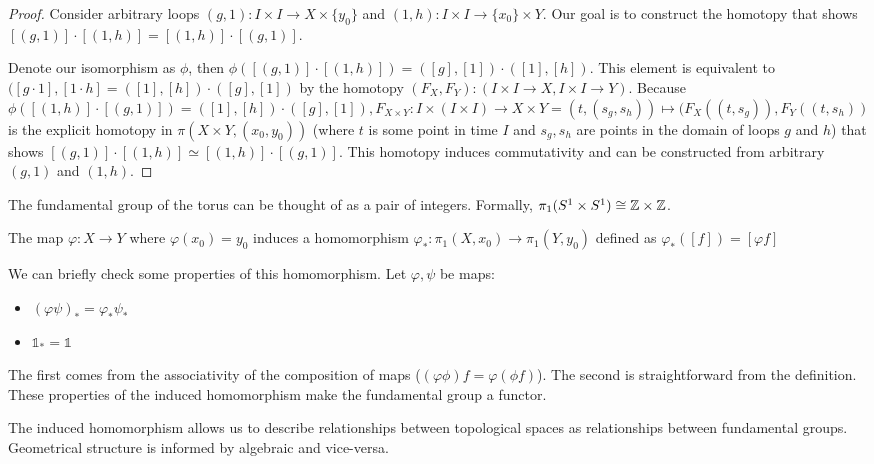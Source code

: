 \documentclass[10pt]{article}
\begin{document}
\begin{proof}
	Consider arbitrary loops $(g, 1): I \times I \to X \times \{y_0\}$ and $(1, h): I
	\times I \to \{ x_0 \} \times Y$. Our goal is to construct the homotopy that
	shows $[(g, 1)] \cdot [(1, h)] = [(1, h)] \cdot [(g, 1)]$.

	Denote our isomorphism as $\phi$, then $\phi([(g, 1)] \cdot [(1, h)]) =
	([g], [1]) \cdot ([1], [h])$. This element is equivalent to $([g \cdot 1], [1
	\cdot h] = ([1], [h]) \cdot ([g], [1])$ by the homotopy $(F_X, F_Y): (I
	\times I \to X, I \times I \to Y)$. Because $\phi([(1, h)]\cdot[(g, 1)]) =
	([1], [h]) \cdot ([g], [1]), F_{X\times Y}: I \times (I \times I) \to X \times
	Y = (t, (s_g, s_h)) \mapsto (F_X((t, s_g)), F_Y((t, s_h))$ is the explicit
	homotopy in $\pi(X \times Y, (x_0, y_0))$ (where $t$ is some point in time
	$I$ and $s_g, s_h$ are points in the domain of loops $g$ and $h$) that shows
	$[(g, 1)]\cdot[(1,h)]\simeq [(1, h)]\cdot[(g, 1)]$. This homotopy induces
	commutativity and can be constructed from arbitrary $(g, 1)$ and $(1, h)$.
\end{proof}

\begin{example}[Torus]
	The fundamental group of the torus can be thought of as a pair of integers. Formally, $\pi_1(S^1 \times S^1) \cong \mathbb{Z} \times \mathbb{Z}$. 
\end{example}

\begin{definition}
	The map $\varphi: X \to Y$ where $\varphi(x_0) = y_0$ induces a homomorphism $\varphi_*: \pi_1(X, x_0) \to \pi_1(Y, y_0)$ defined as $\varphi_*([f]) = [\varphi f]$
\end{definition}

We can briefly check some properties of this homomorphism. Let $\varphi, \psi$ be maps:
\begin{itemize}
	\item{$(\varphi\psi)_* = \varphi_*\psi_*$}
	\item{$\mathds{1}_* = \mathds{1}$}
\end{itemize}
The first comes from the associativity of the composition of maps ($(\varphi
\phi) f = \varphi (\phi f)$). The second
is straightforward from the definition. These properties of the induced homomorphism make the fundamental group a functor.

The induced homomorphism allows us to describe relationships between
topological spaces as relationships between fundamental groups. Geometrical
structure is informed by algebraic and vice-versa.
\end{document}
